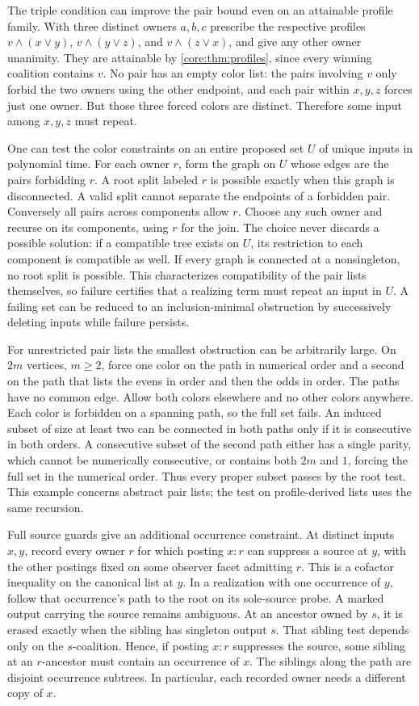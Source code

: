 The triple condition can improve the pair bound even on an
attainable profile family. With three distinct owners $a,b,c$
prescribe the respective profiles
$v\land(x\lor y)$, $v\land(y\lor z)$, and $v\land(z\lor x)$,
and give any other owner unanimity. They are attainable by
\cref{core:thm:profiles}, since every winning coalition contains
$v$. No pair has an empty color list: the pairs involving $v$
only forbid the two owners using the other endpoint, and each
pair within $x,y,z$ forces just one owner. But those three
forced colors are distinct. Therefore some input among
$x,y,z$ must repeat.

One can test the color constraints on an entire proposed set
$U$ of unique inputs in polynomial time. For each owner $r$,
form the graph on $U$ whose edges are the pairs forbidding $r$.
A root split labeled $r$ is possible exactly when this graph is
disconnected. A valid split cannot separate the endpoints of a
forbidden pair. Conversely all pairs across components allow
$r$. Choose any such owner and recurse on its components, using
$r$ for the join. The choice never discards a possible solution:
if a compatible tree exists on $U$, its restriction to each
component is compatible as well. If every graph is connected at
a nonsingleton, no root split is possible. This characterizes
compatibility of the pair lists themselves, so failure certifies
that a realizing term must repeat an input in $U$. A failing
set can be reduced to an inclusion-minimal obstruction by
successively deleting inputs while failure persists.

For unrestricted pair lists the smallest obstruction can be
arbitrarily large. On $2m$ vertices, $m\geq2$, force one color
on the path in numerical order and a second on the path that
lists the evens in order and then the odds in order. The paths
have no common edge. Allow both colors elsewhere and no other
colors anywhere. Each color is forbidden on a spanning path,
so the full set fails. An induced subset of size at least two
can be connected in both paths only if it is consecutive in
both orders. A consecutive subset of the second path either
has a single parity, which cannot be numerically consecutive,
or contains both $2m$ and $1$, forcing the full set in the
numerical order. Thus every proper subset passes by the root
test. This example concerns abstract pair lists; the test on
profile-derived lists uses the same recursion.

Full source guards give an additional occurrence constraint.
At distinct inputs $x,y$, record every owner $r$ for which posting
$x:r$ can suppress a source at $y$, with the other postings fixed
on some observer facet admitting $r$. This is a cofactor
inequality on the canonical list at $y$. In a realization with
one occurrence of $y$, follow that occurrence's path to the
root on its sole-source probe. A marked output carrying the
source remains ambiguous. At an ancestor owned by $s$, it is
erased exactly when the sibling has singleton output $s$.
That sibling test depends only on the $s$-coalition. Hence, if
posting $x:r$ suppresses the source, some sibling at an
$r$-ancestor must contain an occurrence of $x$. The siblings
along the path are disjoint occurrence subtrees. In particular,
each recorded owner needs a different copy of $x$.

